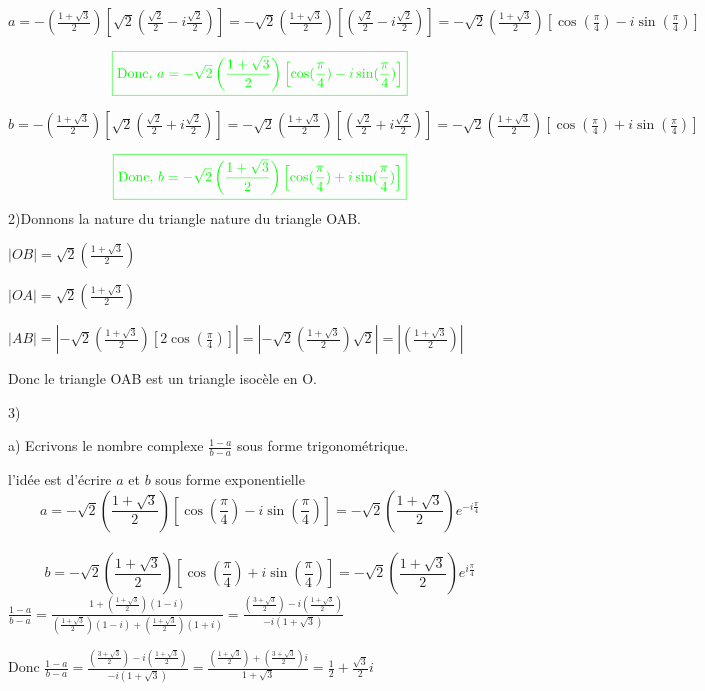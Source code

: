 \documentclass[12pt]{article}
\begin{document}
$a=-(\frac{1+\sqrt{3}}{2})\left[\sqrt{2}(\frac{\sqrt{2}}{2}-i\frac{\sqrt{2}}{2})\right]=-\sqrt{2}(\frac{1+\sqrt{3}}{2})\left[(\frac{\sqrt{2}}{2}-i\frac{\sqrt{2}}{2})\right]=-\sqrt{2}(\frac{1+\sqrt{3}}{2})\left[\cos(\frac{\pi}{4})-i\sin(\frac{\pi}{4})\right] $

\[\color{green}{\boxed{\text{Donc, }a=-\sqrt{2}\left( \frac{1+\sqrt{3}}{2}\right) \left[\cos(\frac{\pi}{4})-i\sin(\frac{\pi}{4})\right]} }\]

$b=-(\frac{1+\sqrt{3}}{2})\left[\sqrt{2}(\frac{\sqrt{2}}{2}+i\frac{\sqrt{2}}{2})\right]=-\sqrt{2}(\frac{1+\sqrt{3}}{2})\left[(\frac{\sqrt{2}}{2}+i\frac{\sqrt{2}}{2})\right]=-\sqrt{2}(\frac{1+\sqrt{3}}{2})\left[\cos(\frac{\pi}{4})+i\sin(\frac{\pi}{4})\right] $

\[\color{green}{\boxed{\text{Donc, }b=-\sqrt{2}\left( \frac{1+\sqrt{3}}{2}\right) \left[\cos(\frac{\pi}{4})+i\sin(\frac{\pi}{4})\right]}}\]
2)Donnons la nature du triangle nature du triangle OAB.

$|OB|=\sqrt{2}\left( \frac{1+\sqrt{3}}{2}\right)$

$|OA|=\sqrt{2}\left( \frac{1+\sqrt{3}}{2}\right)$

$|AB|=|-\sqrt{2}(\frac{1+\sqrt{3}}{2})\left[2\cos(\frac{\pi}{4})\right]|=|-\sqrt{2}(\frac{1+\sqrt{3}}{2})\sqrt{2}|=|(\frac{1+\sqrt{3}}{2})|$

Donc le triangle OAB est un triangle isocèle en O.

3) 

a) Ecrivons le nombre complexe $\frac{1-a}{b-a}$  sous forme trigonométrique.

l'idée est d'écrire $a$ et $b$ sous forme exponentielle \\

\[a=-\sqrt{2}\left( \frac{1+\sqrt{3}}{2}\right) \left[\cos(\frac{\pi}{4})-i\sin(\frac{\pi}{4})\right]=-\sqrt{2}\left( \frac{1+\sqrt{3}}{2}\right)e^{-i\frac{\pi}{4}}\]\\
\[b=-\sqrt{2}\left( \frac{1+\sqrt{3}}{2}\right) \left[\cos(\frac{\pi}{4})+i\sin(\frac{\pi}{4})\right]=-\sqrt{2}\left( \frac{1+\sqrt{3}}{2}\right)e^{i\frac{\pi}{4}}\]
$\frac{1-a}{b-a}=\frac{1+(\frac{1+\sqrt{3}}{2})(1-i)}{(\frac{1+\sqrt{3}}{2})(1-i)+(\frac{1+\sqrt{3}}{2})(1+i)}=
\frac{\left( \frac{3+\sqrt{3}}{2}\right) -i\left(\frac{1+\sqrt{3}}{2}\right)}{-i\left( 1+\sqrt{3}\right) }$


Donc $\frac{1-a}{b-a}=\frac{\left( \frac{3+\sqrt{3}}{2}\right) -i\left(\frac{1+\sqrt{3}}{2}\right)}{-i\left( 1+\sqrt{3}\right)}=\frac{\left(\frac{1+\sqrt{3}}{2}\right)+\left(\frac{3+\sqrt{3}}{2}\right)i}{1+\sqrt{3}}=\frac{1}{2}+\frac{\sqrt{3}}{2}i$
\end{document}
